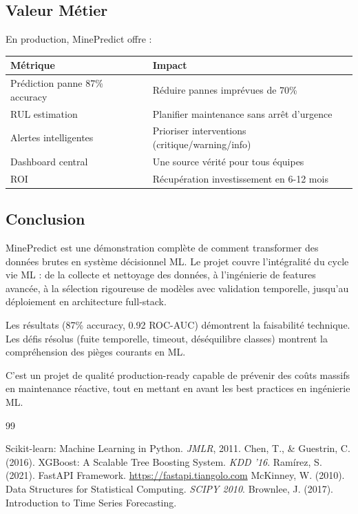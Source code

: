 \documentclass[12pt,a4paper,french]{article}
\begin{document}
\subsection{Valeur Métier}

En production, MinePredict offre :

\begin{table}[H]
\centering
\begin{tabular}{|l|l|}
\hline
\textbf{Métrique} & \textbf{Impact} \\
\hline
Prédiction panne 87\% accuracy & Réduire pannes imprévues de 70\% \\
RUL estimation & Planifier maintenance sans arrêt d'urgence \\
Alertes intelligentes & Prioriser interventions (critique/warning/info) \\
Dashboard central & Une source vérité pour tous équipes \\
ROI & Récupération investissement en 6-12 mois \\
\hline
\end{tabular}
\end{table}

\subsection{Conclusion}

MinePredict est une démonstration complète de comment transformer des données brutes en système décisionnel ML. Le projet couvre l'intégralité du cycle vie ML : de la collecte et nettoyage des données, à l'ingénierie de features avancée, à la sélection rigoureuse de modèles avec validation temporelle, jusqu'au déploiement en architecture full-stack.

Les résultats (87\% accuracy, 0.92 ROC-AUC) démontrent la faisabilité technique. Les défis résolus (fuite temporelle, timeout, déséquilibre classes) montrent la compréhension des pièges courants en ML.

C'est un projet de qualité production-ready capable de prévenir des coûts massifs en maintenance réactive, tout en mettant en avant les best practices en ingénierie ML.

\begin{thebibliography}{99}

 Scikit-learn: Machine Learning in Python. \textit{JMLR}, 2011.
 Chen, T., \& Guestrin, C. (2016). XGBoost: A Scalable Tree Boosting System. \textit{KDD '16}.
 Ramírez, S. (2021). FastAPI Framework. \url{https://fastapi.tiangolo.com}
 McKinney, W. (2010). Data Structures for Statistical Computing. \textit{SCIPY 2010}.
 Brownlee, J. (2017). Introduction to Time Series Forecasting.

\end{thebibliography}
\end{document}

